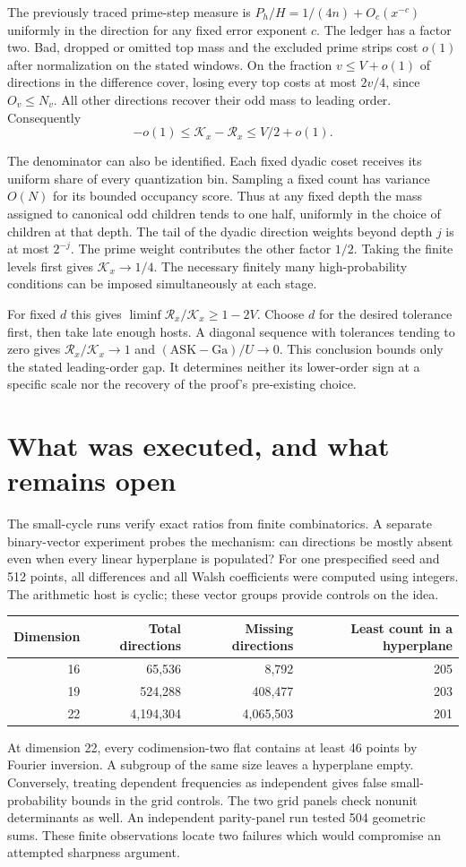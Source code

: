 \documentclass[12pt,letterpaper]{article}
\newcommand{\pagepart}[1]{\clearpage\section{#1}}
\newcommand{\gap}{\mathrm{ASK}-\mathrm{Ga}}
\begin{document}
The previously traced prime-step measure is \(P_h/H=1/(4n)+O_c(x^{-c})\) uniformly in the direction for any fixed error exponent \(c\). The ledger has a factor two. Bad, dropped or omitted top mass and the excluded prime strips cost \(o(1)\) after normalization on the stated windows. On the fraction \(v\le V+o(1)\) of directions in the difference cover, losing every top costs at most \(2v/4\), since \(O_v\le N_v\). All other directions recover their odd mass to leading order. Consequently
\[
           -o(1)\le \mathcal K_x-\mathcal R_x\le V/2+o(1).
\]

The denominator can also be identified. Each fixed dyadic coset receives its uniform share of every quantization bin. Sampling a fixed count has variance \(O(N)\) for its bounded occupancy score. Thus at any fixed depth the mass assigned to canonical odd children tends to one half, uniformly in the choice of children at that depth. The tail of the dyadic direction weights beyond depth \(j\) is at most \(2^{-j}\). The prime weight contributes the other factor \(1/2\). Taking the finite levels first gives \(\mathcal K_x\to1/4\). The necessary finitely many high-probability conditions can be imposed simultaneously at each stage.

For fixed \(d\) this gives \(\liminf\mathcal R_x/\mathcal K_x\ge1-2V\). Choose \(d\) for the desired tolerance first, then take late enough hosts. A diagonal sequence with tolerances tending to zero gives \(\mathcal R_x/\mathcal K_x\to1\) and \((\gap)/U\to0\). This conclusion bounds only the stated leading-order gap. It determines neither its lower-order sign at a specific scale nor the recovery of the proof's pre-existing choice.

\pagepart{What was executed, and what remains open}
The small-cycle runs verify exact ratios from finite combinatorics. A separate binary-vector experiment probes the mechanism: can directions be mostly absent even when every linear hyperplane is populated? For one prespecified seed and 512 points, all differences and all Walsh coefficients were computed using integers. The arithmetic host is cyclic; these vector groups provide controls on the idea.

\begin{center}\begin{tabular}{@{}rrrr@{}}\toprule
Dimension & Total directions & Missing directions & Least count in a hyperplane\\\midrule
16 & 65,536 & 8,792 & 205\\
19 & 524,288 & 408,477 & 203\\
22 & 4,194,304 & 4,065,503 & 201\\\bottomrule
\end{tabular}\end{center}
At dimension 22, every codimension-two flat contains at least 46 points by Fourier inversion. A subgroup of the same size leaves a hyperplane empty. Conversely, treating dependent frequencies as independent gives false small-probability bounds in the grid controls. The two grid panels check nonunit determinants as well. An independent parity-panel run tested 504 geometric sums. These finite observations locate two failures which would compromise an attempted sharpness argument.
\end{document}
